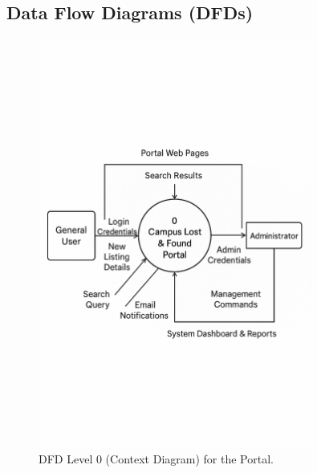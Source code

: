 \documentclass[11pt, a4paper]{article}
\begin{document}
\subsection{Data Flow Diagrams (DFDs)}
\begin{figure}[h!]
    \centering
    \includegraphics[width=0.8\textwidth]{dfd-level-0.png}
    \caption{DFD Level 0 (Context Diagram) for the Portal.}
    \label{fig:dfd0}
\end{figure}
\end{document}
